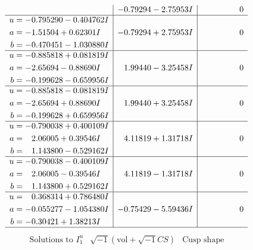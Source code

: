 \documentclass[1p]{elsarticle_modified}
\theoremstyle{definition}
\newcommand{\I}{\sqrt{-1}}
\begin{document}
$$\begin{array}{c|c|c}
 & -0.79294 - 2.75953 I & \phantom{-0.000000 } 0 \\ \hline\begin{aligned}
u &= -0.795290 - 0.404762 I \\
a &= -1.51504 + 0.62301 I \\
b &= -0.470451 - 1.030880 I\end{aligned}
 & -0.79294 + 2.75953 I & \phantom{-0.000000 } 0 \\ \hline\begin{aligned}
u &= -0.885818 + 0.081819 I \\
a &= -2.65694 - 0.88690 I \\
b &= -0.199628 - 0.659956 I\end{aligned}
 & \phantom{-}1.99440 - 3.25458 I & \phantom{-0.000000 } 0 \\ \hline\begin{aligned}
u &= -0.885818 - 0.081819 I \\
a &= -2.65694 + 0.88690 I \\
b &= -0.199628 + 0.659956 I\end{aligned}
 & \phantom{-}1.99440 + 3.25458 I & \phantom{-0.000000 } 0 \\ \hline\begin{aligned}
u &= -0.790038 + 0.400109 I \\
a &= \phantom{-}2.06005 + 0.39546 I \\
b &= \phantom{-}1.143800 - 0.529162 I\end{aligned}
 & \phantom{-}4.11819 + 1.31718 I & \phantom{-0.000000 } 0 \\ \hline\begin{aligned}
u &= -0.790038 - 0.400109 I \\
a &= \phantom{-}2.06005 - 0.39546 I \\
b &= \phantom{-}1.143800 + 0.529162 I\end{aligned}
 & \phantom{-}4.11819 - 1.31718 I & \phantom{-0.000000 } 0 \\ \hline\begin{aligned}
u &= \phantom{-}0.368314 + 0.786480 I \\
a &= -0.055277 - 1.054380 I \\
b &= -0.30421 + 1.38213 I\end{aligned}
 & -0.75429 - 5.59436 I & \phantom{-0.000000 } 0\\
 \hline 
 \end{array}$$\newpage$$\begin{array}{c|c|c}  
\text{Solutions to }I^u_{1}& \I (\text{vol} + \sqrt{-1}CS) & \text{Cusp shape}\\

\end{array}$$
\end{document}
